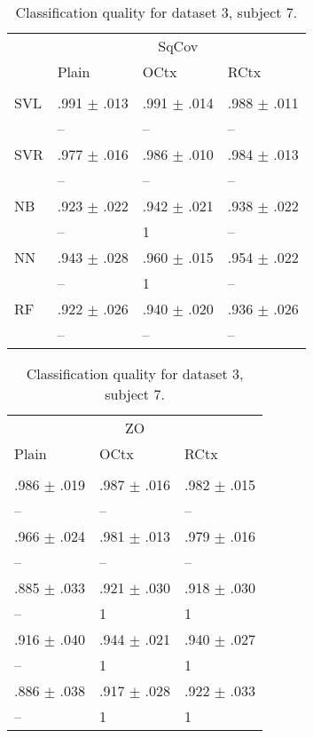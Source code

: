 \begin{table}[htb]
\renewcommand{\arraystretch}{0.6}
\centering
\footnotesize
\caption{Classification quality for dataset 3, subject 7.\label{table:Set3_patient7_res}}
\begin{tabular}{llll}
 & \multicolumn{3}{c}{SqCov} \\
 & Plain & OCtx & RCtx \\
 \cmidrule(lr){2-4}\\
SVL & .991 $\pm$ .013 & .991 $\pm$ .014 & .988 $\pm$ .011 \\
 & -- & -- & -- \\
SVR & .977 $\pm$ .016 & .986 $\pm$ .010 & .984 $\pm$ .013 \\
 & -- & -- & -- \\
NB & .923 $\pm$ .022 & .942 $\pm$ .021 & .938 $\pm$ .022 \\
 & -- & {\scriptsize 1} & -- \\
NN & .943 $\pm$ .028 & .960 $\pm$ .015 & .954 $\pm$ .022 \\
 & -- & {\scriptsize 1} & -- \\
RF & .922 $\pm$ .026 & .940 $\pm$ .020 & .936 $\pm$ .026 \\
 & -- & -- & -- \\
\end{tabular}%
\begin{tabular}{lll}
 \multicolumn{3}{c}{ZO} \\
 Plain & OCtx & RCtx \\
 \cmidrule(lr){1-3}\\
 .986 $\pm$ .019 & .987 $\pm$ .016 & .982 $\pm$ .015 \\
-- & -- & -- \\
 .966 $\pm$ .024 & .981 $\pm$ .013 & .979 $\pm$ .016 \\
  -- & -- & -- \\
 .885 $\pm$ .033 & .921 $\pm$ .030 & .918 $\pm$ .030 \\
  -- & {\scriptsize 1} & {\scriptsize 1} \\
 .916 $\pm$ .040 & .944 $\pm$ .021 & .940 $\pm$ .027 \\
  -- & {\scriptsize 1} & {\scriptsize 1} \\
 .886 $\pm$ .038 & .917 $\pm$ .028 & .922 $\pm$ .033 \\
  -- & {\scriptsize 1} & {\scriptsize 1} \\
\end{tabular}
\end{table}

